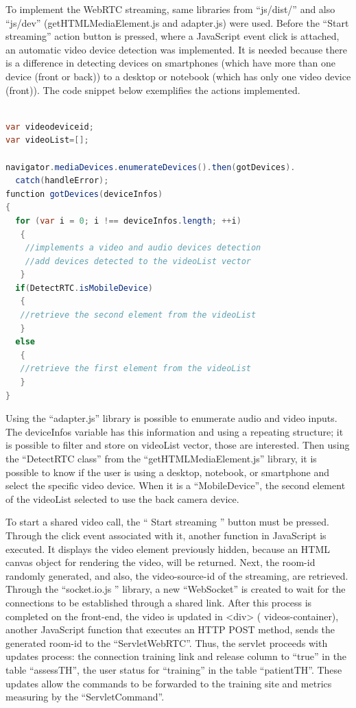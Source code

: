 To implement the WebRTC streaming, same libraries from ``js/dist/'' and also ``js/dev'' (getHTMLMediaElement.js and adapter.js) were used. Before the ``Start streaming'' action button is pressed, where a JavaScript event click is attached, an automatic video device detection was implemented.  It is needed because there is a difference in detecting devices on smartphones (which have more than one device (front or back)) to a desktop or notebook (which has only one video device (front)). The code snippet below exemplifies the actions implemented. \newline

\begin{lstlisting}[frame=single,language=Java]  % Start your code-block

var videodeviceid;
var videoList=[];

navigator.mediaDevices.enumerateDevices().then(gotDevices).
  catch(handleError);
function gotDevices(deviceInfos) 
{
  for (var i = 0; i !== deviceInfos.length; ++i) 
   {
    //implements a video and audio devices detection
    //add devices detected to the videoList vector
   }
  if(DetectRTC.isMobileDevice)
   {
   //retrieve the second element from the videoList
   }
  else
   {
   //retrieve the first element from the videoList
   }
}
\end{lstlisting}

Using the ``adapter.js'' library is possible to enumerate audio and video inputs. The deviceInfos variable has this information and using a repeating structure; it is possible to filter and store on videoList vector, those are interested. Then using the ``DetectRTC class'' from the ``getHTMLMediaElement.js'' library, it is possible to know if the user is using a desktop, notebook, or smartphone and select the specific video device. When it is a ``MobileDevice'', the second element of the videoList selected to use the back camera device.

To start a shared video call, the `` Start streaming '' button must be pressed. Through the click event associated with it, another function in JavaScript is executed. It displays the video element previously hidden, because an HTML canvas object for rendering the video, will be returned. Next, the room-id randomly generated, and also, the video-source-id of the streaming, are retrieved. Through the ``socket.io.js '' library, a new ``WebSocket'' is created to wait for the connections to be established through a shared link. After this process is completed on the front-end, the video is updated in <div> ( videos-container), another JavaScript function that executes an HTTP POST method, sends the generated room-id to the ``ServletWebRTC''. Thus, the servlet proceeds with updates process: the connection training link and release column to ``true'' in the table ``assessTH'',  the user status for ``training''  in the table ``patientTH''. These updates allow the commands to be forwarded to the training site and metrics measuring by the ``ServletCommand''. 


